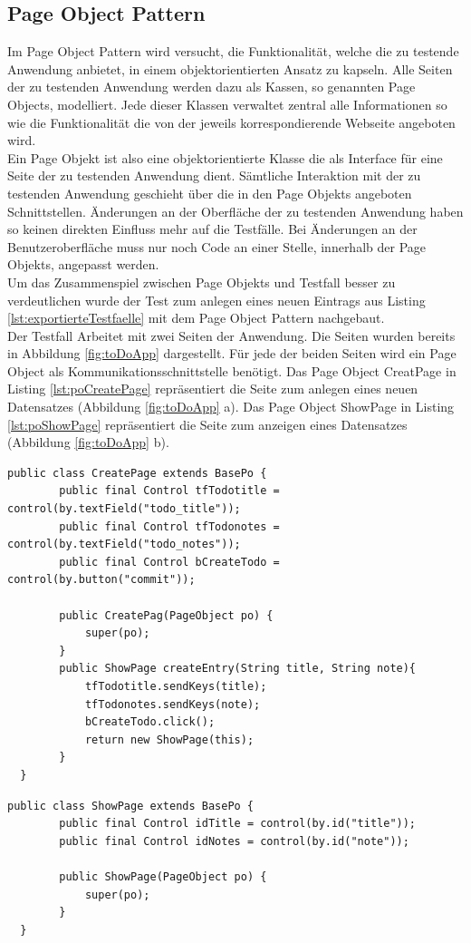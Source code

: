 \subsection{Page Object Pattern}
\label{sec:page_object_pattern}
Im Page Object Pattern wird versucht, die Funktionalität, welche die zu testende Anwendung anbietet, in einem objektorientierten Ansatz zu kapseln.
Alle Seiten der zu testenden Anwendung werden dazu als Kassen, so genannten Page Objects, modelliert. Jede dieser Klassen verwaltet zentral alle Informationen so wie die Funktionalität die von der jeweils korrespondierende Webseite angeboten wird.\\
Ein Page Objekt ist also eine objektorientierte Klasse die als Interface für eine Seite der zu testenden Anwendung dient.
Sämtliche Interaktion mit der zu testenden Anwendung geschieht über die in den Page Objekts angeboten Schnittstellen.
Änderungen an der Oberfläche der zu testenden Anwendung haben so keinen direkten Einfluss mehr auf die Testfälle. Bei Änderungen an der Benutzeroberfläche muss nur noch Code an einer Stelle, innerhalb der Page Objekts, angepasst werden.\\
Um das Zusammenspiel zwischen Page Objekts und Testfall besser zu verdeutlichen wurde der Test zum anlegen eines neuen Eintrags aus Listing \ref{lst:exportierteTestfaelle} mit dem Page Object Pattern nachgebaut.\\
Der Testfall Arbeitet mit zwei Seiten der Anwendung. Die Seiten wurden bereits in Abbildung \ref{fig:toDoApp} dargestellt. Für jede der beiden Seiten wird ein Page Object als Kommunikationsschnittstelle benötigt. 
Das Page Object CreatPage in Listing \ref{lst:poCreatePage} repräsentiert die Seite zum anlegen eines neuen Datensatzes (Abbildung \ref{fig:toDoApp} a). Das Page Object ShowPage in Listing \ref{lst:poShowPage} repräsentiert die Seite zum anzeigen eines Datensatzes (Abbildung \ref{fig:toDoApp} b).

\begin{lstlisting}[caption={Page Object CreatePage},label={lst:poCreatePage}]
  public class CreatePage extends BasePo {
		public final Control tfTodotitle = control(by.textField("todo_title"));
		public final Control tfTodonotes = control(by.textField("todo_notes"));
		public final Control bCreateTodo = control(by.button("commit"));
		
		public CreatePag(PageObject po) {
			super(po);
		}
		public ShowPage createEntry(String title, String note){
			tfTodotitle.sendKeys(title);
			tfTodonotes.sendKeys(note);
			bCreateTodo.click();
			return new ShowPage(this);
		}
  }
\end{lstlisting}  
\begin{lstlisting}[caption={Page Object ShowPage},label={lst:poShowPage}]  
  public class ShowPage extends BasePo {
		public final Control idTitle = control(by.id("title"));
		public final Control idNotes = control(by.id("note"));

		public ShowPage(PageObject po) {
			super(po);
		}
  }
\end{lstlisting}

